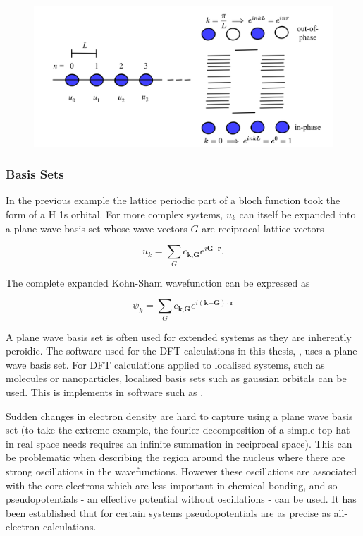\begin{figure}[h]
\centering
  \includegraphics[width=1.0\columnwidth]{figures/ch3/bands.png}
  \caption[]{} 
  \label{bands}
\end{figure}

\subsubsection{Basis Sets}   %

In the previous example the lattice periodic part of a bloch function took the form of a H 1s orbital. For more complex systems, $u_k$ can itself be expanded into a plane wave basis set whose wave vectors $G$ are reciprocal lattice vectors

\begin{equation}
u_k = \sum_Gc_{\textbf{k},\textbf{G}}e^{i\textbf{G}\cdot\textbf{r}}.
\end{equation}

The complete expanded Kohn-Sham wavefunction can be expressed as

\begin{equation} \label{KSeigenstates}
\psi_k = \sum_Gc_{\textbf{k},\textbf{G}}e^{i(\textbf{k+G})\cdot\textbf{r}}
\end{equation}

A plane wave basis set is often used for extended systems as they are inherently peroidic. The software used for the DFT calculations in this thesis, \autocite{}, uses a plane wave basis set. For DFT calculations applied to localised systems, such as molecules or nanoparticles, localised basis sets such as gaussian orbitals can be used. This is implements in software such as \autcite{}.

Sudden changes in electron density are hard to capture using a plane wave basis set (to take the extreme example, the fourier decomposition of a simple top hat in real space needs requires an infinite summation in reciprocal space). This can be problematic when describing the region around the nucleus where there are strong oscillations in the wavefunctions. However these oscillations are associated with the core electrons which are less important in chemical bonding, and so pseudopotentials - an effective potential without oscillations - can be used. It has been established that for certain systems pseudopotentials are as precise as all-electron calculations.\autocite{Lejaeghere2016a}

